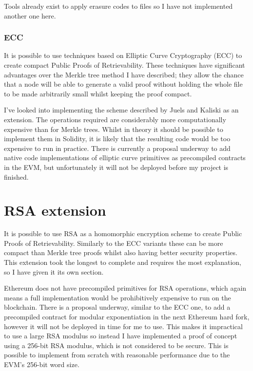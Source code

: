 \documentclass[12pt,a4paper,twoside,openright]{report}
\begin{document}
Tools already exist to apply erasure codes to files so I have not implemented another one here.


\subsubsection{ECC}


It is possible to use techniques based on Elliptic Curve Cryptography (ECC) to create compact Public Proofs of Retrievability.
These techniques have significant advantages over the Merkle tree method I have described; they allow the chance
that a node will be able to generate a valid proof without holding the whole file to be made arbitrarily small whilst keeping the proof compact.

I've looked into implementing the scheme described by Juels and Kaliski\cite{ecc-por} as an extension.
The operations required are considerably more computationally expensive than for Merkle trees.
Whilst in theory it should be possible to implement them in Solidity, it is likely that the resulting code would be too expensive to run in practice.
There is currently a proposal underway to add native code implementations of elliptic curve primitives
as precompiled contracts in the EVM\cite{eip-ecc}, but unfortunately it will not be deployed before my project is finished.



\section{RSA extension}

It is possible to use RSA as a homomorphic encryption scheme to create Public Proofs of Retrievability.
Similarly to the ECC variants these can be more compact than Merkle tree proofs whilst also having better security properties.
This extension took the longest to complete and requires the most explanation, so I have given it its own section.

Ethereum does not have precompiled primitives for RSA operations, which again means a full implementation
would be prohibitively expensive to run on the blockchain.
There is a proposal underway, similar to the ECC one, to add a precompiled contract for modular exponentiation in the next Ethereum hard fork\cite{eip-rsa},
however it will not be deployed in time for me to use.
This makes it impractical to use a large RSA modulus so instead I have implemented a proof of concept using a 256-bit RSA modulus, which is not considered to be secure.
This is possible to implement from scratch with reasonable performance due to the EVM's 256-bit word size.
\end{document}
